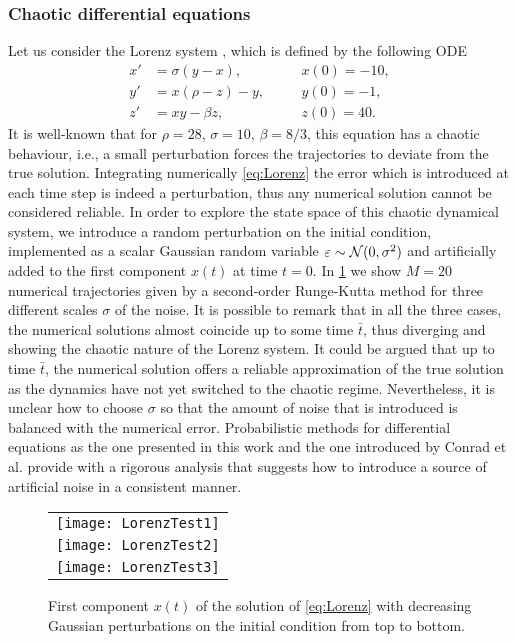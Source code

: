 \documentclass[final,onefignum,onetabnum]{siamonline171218}
\begin{document}
\subsubsection*{Chaotic differential equations} Let us consider the Lorenz system \cite{Lor63}, which is defined by the following ODE
\begin{equation}\label{eq:Lorenz}
\begin{aligned}
	x' &= \sigma(y - x), \quad &&x(0) = -10,\\
	y' &= x(\rho - z) - y, \quad &&y(0) = -1,\\
	z' &= xy - \beta z, \quad &&z(0) = 40.
\end{aligned}
\end{equation}
It is well-known that for $\rho=28$, $\sigma=10$, $\beta=8/3$, this equation has a chaotic behaviour, i.e., a small perturbation forces the trajectories to deviate from the true solution. Integrating numerically \eqref{eq:Lorenz} the error which is introduced at each time step is indeed a perturbation, thus any numerical solution cannot be considered reliable. In order to explore the state space of this chaotic dynamical system, we introduce a random perturbation on the initial condition, implemented as a scalar Gaussian random variable $\varepsilon \sim \mathcal{N}(0, \sigma^2)$ and artificially added to the first component $x(t)$ at time $t = 0$. In \cref{fig:LorenzTest} we show $M = 20$ numerical trajectories given by a second-order Runge-Kutta method for three different scales $\sigma$ of the noise. It is possible to remark that in all the three cases, the numerical solutions almost coincide up to some time $\bar t$, thus diverging and showing the chaotic nature of the Lorenz system. It could be argued that up to time $\bar t$, the numerical solution offers a reliable approximation of the true solution as the dynamics have not yet switched to the chaotic regime. Nevertheless, it is unclear how to choose $\sigma$ so that the amount of noise that is introduced is balanced with the numerical error. Probabilistic methods for differential equations as the one presented in this work and the one introduced by Conrad et al. \cite{CGS16} provide with a rigorous analysis that suggests how to introduce a source of artificial noise in a consistent manner.
 
\begin{figure}
	\begin{center}
		\begin{tabular}{c}
			\texttt{[image: LorenzTest1]} \\
			\texttt{[image: LorenzTest2]} \\
			\texttt{[image: LorenzTest3]}
		\end{tabular}
	\end{center}
	\caption{First component $x(t)$ of the solution of \eqref{eq:Lorenz} with decreasing Gaussian perturbations on the initial condition from top to bottom.}
	\label{fig:LorenzTest}
\end{figure}
\end{document}
